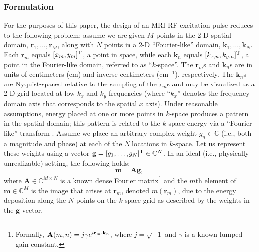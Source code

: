 \documentclass[final]{siamltex}
\newcommand{\field}[1]{\mathbb{#1}}
\newcommand{\la}[1]{\mbox{$\mathbf{#1}$}}  \newcommand{\sst}[1]{\mbox{\scriptsize{#1}}}
\begin{document}
   \subsubsection{Formulation} For the purposes of this paper, the
   design of an MRI RF excitation pulse reduces to the following
   problem: assume we are given $M$ points in the 2-D spatial domain,
   $\la{r}_1, \ldots, \la{r}_M$, along with $N$ points in a 2-D
   ``Fourier-like'' domain, $\la{k}_1, \ldots, \la{k}_N$.  Each
   $\la{r}_m$ equals $[x_m, y_m]^{\sst{T}}$, a point in space, while
   each $\la{k}_n$ equals $[k_{x,n}, k_{y,n}]^{\sst{T}}$, a point in
   the Fourier-like domain, referred to as ``$k$-space''.  The
   $\la{r}_m$s and $\la{k}_n$s are in units of centimeters (cm) and
   inverse centimeters ($\mbox{cm}^{-1}$), respectively.  The
   $\la{k}_n$s are Nyquist-spaced relative to the sampling of the
   $\la{r}_m$s and may be visualized as a 2-D grid located at low
   $k_x$ and $k_y$ frequencies (where ``$k_x$'' denotes the frequency
   domain axis that corresponds to the spatial $x$ axis).  Under
   reasonable assumptions, energy placed at one or more points in
   $k$-space produces a pattern in the spatial domain; this pattern is
   related to the $k$-space energy via a ``Fourier-like'' transform
   \cite{Pau1989}.  Assume we place an arbitrary complex weight $g_n
   \in \field{C}$ (i.e., both a magnitude and phase) at each of the
   $N$ locations in $k$-space.  Let us represent these weights using a
   vector $\la{g} = [g_1, \ldots, g_N]^{\sst{T}} \in \field{C}^{N}$.
   In an ideal (i.e., physically-unrealizable) setting, the following
   holds:
   \begin{equation}\label{mri1} 
        \la{m} = \la{A} \la{g},
   \end{equation}
   where $\la{A} \in \field{C}^{M \times N}$ is a known dense Fourier
   matrix\footnote{Formally, $\la{A}(m,n) = j \gamma e^{i
   \mbox{\scriptsize{\la{r}}}_m \cdot \mbox{\scriptsize{\la{k}}}_n}$,
   where $j = \sqrt{-1}$ and $\gamma$ is a known lumped gain
   constant.} and the $m$th element of $\la{m} \in \field{C}^{M}$ is
   the image that arises at $\la{r}_m$, denoted $m(\la{r}_m)$, due to
   the energy deposition along the $N$ points on the $k$-space grid as
   described by the weights in the $\la{g}$ vector.
   
\end{document}
